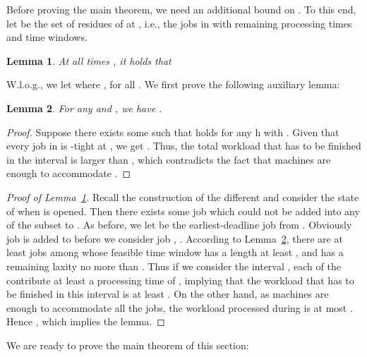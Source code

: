\documentclass[letterpaper,11pt]{article}
\newtheorem{lemma}{Lemma}
\begin{document}
Before proving the main theorem, we need an additional bound on . To this end, let  be the set of residues of  at , i.e., the jobs in  with remaining processing times and time windows.

\begin{lemma}\label{lemma:partition-at-time-t} At all times , it holds that

\end{lemma}

W.l.o.g., we let  where , for all . We first prove the following auxiliary lemma:

\begin{lemma}\label{lemma:length-shrink}
For any  and , we have .
\end{lemma}
\begin{proof}
Suppose there exists some  such that  holds for any h with . Given that every job in  is -tight at , we get . Thus, the total workload that has to be finished in the interval  is larger than , which contradicts the fact that  machines are enough to accommodate .
\end{proof}

\begin{proof}[Proof of Lemma~\ref{lemma:partition-at-time-t}]
Recall the construction of the different  and consider the state of  when  is opened. Then there exists some job  which could not be added into any of the subset  to . As before, we let  be the earliest-deadline job from . Obviously job  is added to  before we consider job , . According to Lemma~\ref{lemma:length-shrink}, there are at least  jobs among  whose feasible time window has a length at least , and has a remaining laxity no more than . Thus if we consider the interval , each of the  contribute at least a processing time of , implying that the workload that has to be finished in this interval is at least . On the other hand, as  machines are enough to accommodate all the jobs, the workload processed during  is at most . Hence , which implies the lemma.
\end{proof}

We are ready to prove the main theorem of this section:
\end{document}
